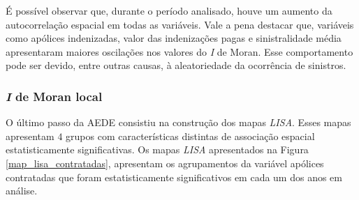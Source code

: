 É possível observar que, durante o período analisado, houve um aumento da autocorrelação espacial em todas as variáveis. Vale a pena destacar que, variáveis como apólices indenizadas, valor das indenizações pagas e sinistralidade média apresentaram maiores oscilações nos valores do \textit{I} de Moran. Esse comportamento pode ser devido, entre outras causas, à aleatoriedade da ocorrência de sinistros. 


\subsubsection{\textit{I} de Moran local}

O último passo da AEDE consistiu na construção dos mapas \textit{LISA}. Esses mapas apresentam $4$ grupos com características distintas de associação espacial estatisticamente significativas. 
Os mapas \textit{LISA} apresentados  na Figura \ref{map_lisa_contratadas}, apresentam os agrupamentos da variável apólices contratadas que foram estatisticamente significativos em cada um dos anos em análise. 

